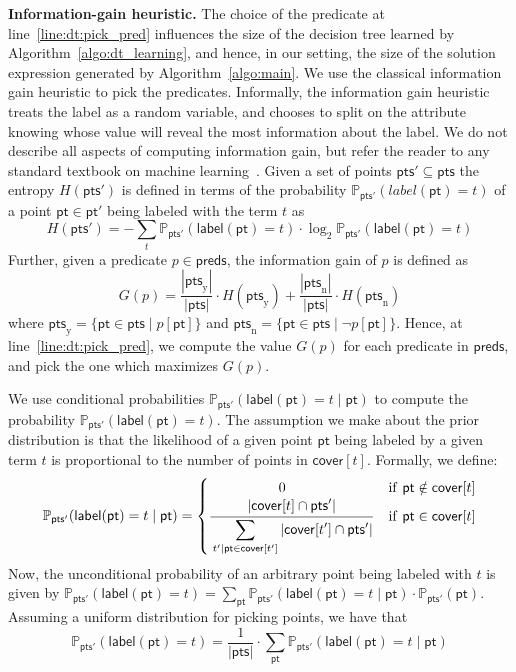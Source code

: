 \documentclass{llncs}
\newcommand\Points{\mathsf{pts}}
\newcommand\Point{\mathsf{pt}}
\newcommand\Predicates{\mathsf{preds}}
\newcommand\Pred{p}
\newcommand\Term{t}
\newcommand\Cover{\mathsf{cover}}
\newcommand\Prob[2]{\mathbb{P}_{#1}(#2)}
\renewcommand{\paragraph}[1]{\par\noindent\textbf{#1.}}
\newcommand{\labl}[1]{\mathsf{label}(#1)}
\begin{document}
\paragraph{Information-gain heuristic}
The choice of the predicate at line~\ref{line:dt:pick_pred} influences
the size of the decision tree learned by
Algorithm~\ref{algo:dt_learning}, and hence, in our setting, the size of
the solution expression generated by Algorithm~\ref{algo:main}.
We use the classical information gain heuristic to pick the predicates.
Informally, the information gain heuristic treats the label as a random
variable, and chooses to split on the attribute knowing whose value
will reveal the most information about the label.
We do not describe all aspects of computing information gain, but
refer the reader to any standard textbook on machine
learning~\cite{bishop-book}.
Given a set of points $\Points' \subseteq \Points$ the entropy
$H(\Points')$ is defined in terms of the probability
$\Prob{\Points'}{label(\Point) = t}$ of a point $\Point \in \Point'$ being
labeled with the term $\Term$ as
\[
H(\Points') = -\sum_{\Term} \Prob{\Points'}{\labl{\Point} = \Term} \cdot \log_2{\Prob{\Points'}{\labl{\Point} = \Term}}
\]
Further, given a predicate $\Pred \in \Predicates$, the information
gain of $\Pred$ is defined as
\[
G(\Pred) = \frac{|\Points_{\mathrm{y}}|}{|\Points|} \cdot
H(\Points_{\mathrm{y}}) + \frac{|\Points_{\mathrm{n}}|}{|\Points|} \cdot
H(\Points_{\mathrm{n}})
\]
where $\Points_{\mathrm{y}} = \{\Point \in \Points \mid \Pred[\Point]\}$ and
$\Points_{\mathrm{n}} = \{\Point \in \Points \mid \neg\Pred[\Point]\}$.
Hence, at line~\ref{line:dt:pick_pred}, we compute the value $G(\Pred)$
for each predicate in $\Predicates$, and pick the one which maximizes
$G(\Pred)$.

We use conditional probabilities $\Prob{\Points'}{\labl{\Point} = \Term \mid
\Point}$ to compute the probability $\Prob{\Points'}{\labl{\Point} = t}$.
The assumption we make about the prior distribution is that the
likelihood of a given point $\Point$ being labeled by a given term
$\Term$ is proportional to the number of points in $\Cover[\Term]$.
Formally, we define:
\[
    \Prob{\Points'}{\labl{\Point} = t \mid \Point} =
    \begin{cases}
        \qquad\qquad\quad 0  & \mathrm{if}\ \Point \notin \Cover[\Term]\\
      \displaystyle
      \frac{\strut\displaystyle\vert \Cover[\Term] \cap \Points' \vert}{\strut\displaystyle\sum_{\Term'
          | \Point \in \Cover[\Term']} \vert \Cover[\Term'] \cap \Points' \vert } & \mathrm{if}\
      \Point \in \Cover[\Term] \\
    \end{cases}
\]
Now, the unconditional probability of an arbitrary point being labeled
with $\Term$ is given by $\Prob{\Points'}{\labl{\Point} = \Term} = \sum_{\Point}
\Prob{\Points'}{\labl{\Point} = \Term \mid \Point}\cdot\Prob{\Points'}{\Point}$.
Assuming a uniform distribution for picking points, we have that
\[
    \Prob{\Points'}{\labl{\Point} = t} =  \frac{1}{\vert \Points \vert} \cdot \sum_{\Point} \Prob{\Points'}{\labl{\Point} = \Term \mid \Point}
\]
\end{document}

